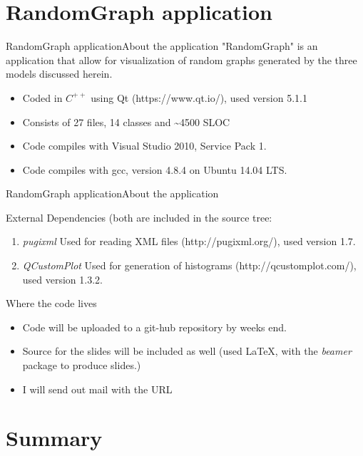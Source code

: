 \documentclass{beamer}
\begin{document}
\section{RandomGraph application}
\begin{frame}{RandomGraph application}{About the application}
"RandomGraph" is an application that allow for visualization of random graphs generated by the three models discussed herein. \\ 
\begin{itemize}
\item Coded in $C^{++}$ using Qt (https://www.qt.io/), used version 5.1.1
\item Consists of 27 files, 14 classes and \textasciitilde4500 SLOC
\item Code compiles with Visual Studio 2010, Service Pack 1.
\item Code compiles with gcc, version 4.8.4 on Ubuntu 14.04 LTS.
\end{itemize}
\end{frame}

\begin{frame}{RandomGraph application}{About the application}

External Dependencies (both are included in the source tree:
\begin{enumerate}
\item {\em pugixml} Used for reading XML files (http://pugixml.org/), used version 1.7.
\item {\em QCustomPlot} Used for generation of histograms (http://qcustomplot.com/), used version 1.3.2.
\end{enumerate}

\end{frame}

\begin{frame}{Where the code lives}
\begin{itemize}
\item Code will be uploaded to a git-hub repository by weeks end.
\item Source for the slides will be included as well (used \LaTeX, with the {\em beamer} package to produce slides.)
\item I will send out mail with the URL
\end{itemize}
\end{frame}

\section{Summary}
\end{document}
